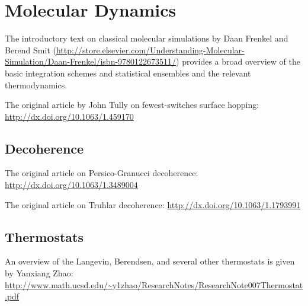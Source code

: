 \documentclass[12pt,letter,footinclude=true,headinclude=true,hyphens]{book} %
\begin{document}
    \section{Molecular Dynamics}
    
    The introductory text on classical molecular simulations by Daan Frenkel and Berend Smit (\url{http://store.elsevier.com/Understanding-Molecular-Simulation/Daan-Frenkel/isbn-9780122673511/}) provides a broad overview of the basic integration schemes and statistical ensembles and the relevant thermodynamics.
    
    \noindent The original article by John Tully on fewest-switches surface hopping: \url{http://dx.doi.org/10.1063/1.459170}
    
    \subsection{Decoherence}
    
    The original article on Persico-Granucci decoherence: \url{http://dx.doi.org/10.1063/1.3489004}
    
    \noindent The original article on Truhlar decoherence: \url{http://dx.doi.org/10.1063/1.1793991}
    
    \subsection{Thermostats}
    
    An overview of the Langevin, Berendsen, and several other thermostats is given by Yanxiang Zhao: \url{http://www.math.ucsd.edu/~y1zhao/ResearchNotes/ResearchNote007Thermostat.pdf}
\end{document}
